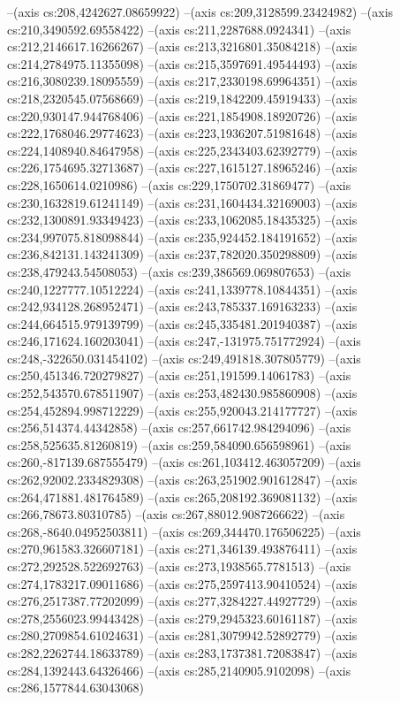 --(axis cs:208,4242627.08659922)
--(axis cs:209,3128599.23424982)
--(axis cs:210,3490592.69558422)
--(axis cs:211,2287688.0924341)
--(axis cs:212,2146617.16266267)
--(axis cs:213,3216801.35084218)
--(axis cs:214,2784975.11355098)
--(axis cs:215,3597691.49544493)
--(axis cs:216,3080239.18095559)
--(axis cs:217,2330198.69964351)
--(axis cs:218,2320545.07568669)
--(axis cs:219,1842209.45919433)
--(axis cs:220,930147.944768406)
--(axis cs:221,1854908.18920726)
--(axis cs:222,1768046.29774623)
--(axis cs:223,1936207.51981648)
--(axis cs:224,1408940.84647958)
--(axis cs:225,2343403.62392779)
--(axis cs:226,1754695.32713687)
--(axis cs:227,1615127.18965246)
--(axis cs:228,1650614.0210986)
--(axis cs:229,1750702.31869477)
--(axis cs:230,1632819.61241149)
--(axis cs:231,1604434.32169003)
--(axis cs:232,1300891.93349423)
--(axis cs:233,1062085.18435325)
--(axis cs:234,997075.818098844)
--(axis cs:235,924452.184191652)
--(axis cs:236,842131.143241309)
--(axis cs:237,782020.350298809)
--(axis cs:238,479243.54508053)
--(axis cs:239,386569.069807653)
--(axis cs:240,1227777.10512224)
--(axis cs:241,1339778.10844351)
--(axis cs:242,934128.268952471)
--(axis cs:243,785337.169163233)
--(axis cs:244,664515.979139799)
--(axis cs:245,335481.201940387)
--(axis cs:246,171624.160203041)
--(axis cs:247,-131975.751772924)
--(axis cs:248,-322650.031454102)
--(axis cs:249,491818.307805779)
--(axis cs:250,451346.720279827)
--(axis cs:251,191599.14061783)
--(axis cs:252,543570.678511907)
--(axis cs:253,482430.985860908)
--(axis cs:254,452894.998712229)
--(axis cs:255,920043.214177727)
--(axis cs:256,514374.44342858)
--(axis cs:257,661742.984294096)
--(axis cs:258,525635.81260819)
--(axis cs:259,584090.656598961)
--(axis cs:260,-817139.687555479)
--(axis cs:261,103412.463057209)
--(axis cs:262,92002.2334829308)
--(axis cs:263,251902.901612847)
--(axis cs:264,471881.481764589)
--(axis cs:265,208192.369081132)
--(axis cs:266,78673.80310785)
--(axis cs:267,88012.9087266622)
--(axis cs:268,-8640.04952503811)
--(axis cs:269,344470.176506225)
--(axis cs:270,961583.326607181)
--(axis cs:271,346139.493876411)
--(axis cs:272,292528.522692763)
--(axis cs:273,1938565.7781513)
--(axis cs:274,1783217.09011686)
--(axis cs:275,2597413.90410524)
--(axis cs:276,2517387.77202099)
--(axis cs:277,3284227.44927729)
--(axis cs:278,2556023.99443428)
--(axis cs:279,2945323.60161187)
--(axis cs:280,2709854.61024631)
--(axis cs:281,3079942.52892779)
--(axis cs:282,2262744.18633789)
--(axis cs:283,1737381.72083847)
--(axis cs:284,1392443.64326466)
--(axis cs:285,2140905.9102098)
--(axis cs:286,1577844.63043068)
